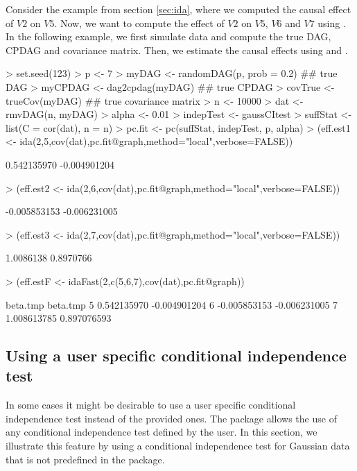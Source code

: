 \documentclass[article]{jss}
\begin{document}
Consider the example from section \ref{sec:ida}, where we computed the
causal effect of $V2$ on $V5$. Now, we want to compute the effect of
$V2$ on $V5$, $V6$ and $V7$ using . In the following
example, we first simulate data and compute the true DAG, CPDAG and
covariance matrix. Then, we estimate the causal effects using
 and .
\begin{Schunk}
\begin{Sinput}
> set.seed(123)
> p <- 7
> myDAG <- randomDAG(p, prob = 0.2) ## true DAG
> myCPDAG <- dag2cpdag(myDAG) ## true CPDAG
> covTrue <- trueCov(myDAG) ## true covariance matrix
> n <- 10000
> dat <- rmvDAG(n, myDAG)
> alpha <- 0.01
> indepTest <- gaussCItest 
> suffStat <- list(C = cor(dat), n = n)
> pc.fit <- pc(suffStat, indepTest, p, alpha)
> (eff.est1 <- ida(2,5,cov(dat),pc.fit@graph,method="local",verbose=FALSE))
\end{Sinput}
\begin{Soutput}
[1]  0.542135970 -0.004901204
\end{Soutput}
\begin{Sinput}
> (eff.est2 <- ida(2,6,cov(dat),pc.fit@graph,method="local",verbose=FALSE))
\end{Sinput}
\begin{Soutput}
[1] -0.005853153 -0.006231005
\end{Soutput}
\begin{Sinput}
> (eff.est3 <- ida(2,7,cov(dat),pc.fit@graph,method="local",verbose=FALSE))
\end{Sinput}
\begin{Soutput}
[1] 1.0086138 0.8970766
\end{Soutput}
\begin{Sinput}
> (eff.estF <- idaFast(2,c(5,6,7),cov(dat),pc.fit@graph))
\end{Sinput}
\begin{Soutput}
      beta.tmp     beta.tmp
5  0.542135970 -0.004901204
6 -0.005853153 -0.006231005
7  1.008613785  0.897076593
\end{Soutput}
\end{Schunk}

\subsection{Using a user specific conditional independence test} 

In some cases it might be desirable to use a user specific conditional
independence test instead of the provided ones. The 
package allows the use of any conditional independence test defined by
the user. In this section, we illustrate this feature by using a
conditional independence test for Gaussian data that is not predefined
in the package.
\end{document}
